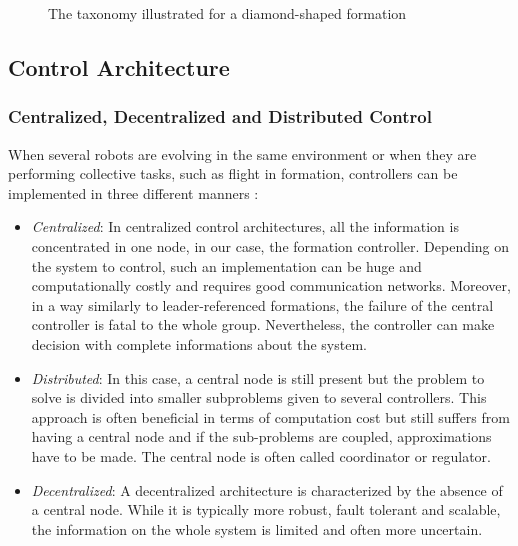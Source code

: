 \documentclass[a4paper, 12pt]{report}
\begin{document}
\begin{figure}[htbp]
\hspace{0.2cm}
\hspace{0.2cm}
\caption{The taxonomy illustrated for a diamond-shaped formation}
\label{fig:graphs}
\end{figure}

\subsection{Control Architecture}
\subsubsection{Centralized, Decentralized and Distributed Control}

When several robots are evolving in the same environment or when they are performing collective tasks, such as flight in formation, controllers can be implemented in three different manners \cite{Scattolini2009}:
\begin{itemize}
\item \emph{Centralized}: In centralized control architectures, all the information is concentrated in one node, in our case, the formation controller. Depending on the system to control, such an implementation can be huge and computationally costly and requires good communication networks. Moreover, in a way similarly to leader-referenced formations, the failure of the central controller is fatal to the whole group. Nevertheless, the controller can make decision with complete informations about the system.
\item \emph{Distributed}: In this case, a central node is still present but the problem to solve is divided into smaller subproblems given to several controllers. This approach is often beneficial in terms of computation cost but still suffers from having a central node and if the sub-problems are coupled, approximations have to be made. The central node is often called coordinator or regulator.
\item \emph{Decentralized}: A decentralized architecture is characterized by the absence of a central node. While it is typically more robust, fault tolerant and scalable, the information on the whole system is limited and often more uncertain.
\end{itemize}
\end{document}
